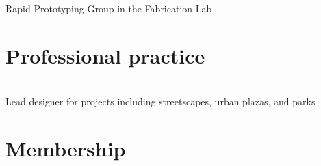 \documentclass[]{baharmon-cv}
\begin{document}
{{{{{Rapid Prototyping Group in the Fabrication Lab

\sectiondivider


\section{Professional practice}
\begin{minipage}[t]{0.80\textwidth} 
\end{minipage}
\begin{minipage}[t]{0.20\textwidth} 
\end{minipage}\\
Lead designer for projects including streetscapes, urban plazas, and parks



\section{Membership}
\begin{minipage}[t]{0.80\textwidth} 
\end{minipage}
\begin{minipage}[t]{0.20\textwidth} 
\end{minipage}
\\

\begin{minipage}[t]{0.80\textwidth} 
\end{minipage}
\begin{minipage}[t]{0.20\textwidth} 
\end{minipage}
\\

\begin{minipage}[t]{0.80\textwidth} 
\end{minipage}
\begin{minipage}[t]{0.20\textwidth} 
\end{minipage}
\\

}}}}}
\end{document}
